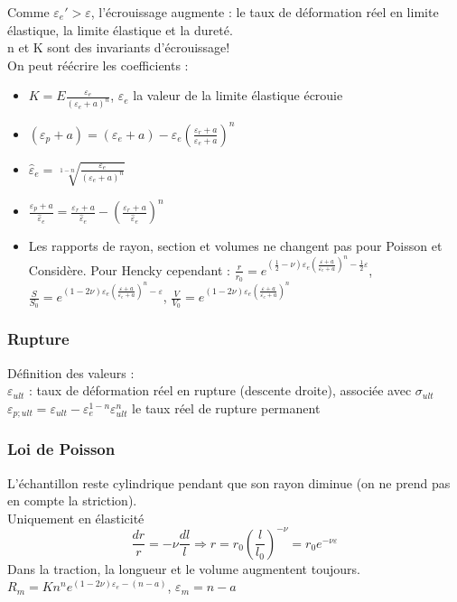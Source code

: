 \documentclass[../main.tex]{subfiles}
\begin{document}
Comme $\varepsilon_e' > \varepsilon$, l'écrouissage augmente : le taux de déformation réel en limite élastique, la limite élastique et la dureté.\\
\warning n et K sont des invariants d'écrouissage!\\

On peut réécrire les coefficients : \begin{itemize}
    \item $K = E \frac{\varepsilon_e}{(\varepsilon_e+a)^n}$, $\varepsilon_e$ la valeur de la limite élastique écrouie\\
    \item $(\varepsilon_p+a) = (\varepsilon_e+a) - \varepsilon_e (\frac{\varepsilon_r+a}{\varepsilon_e+a})^n$\\
    \item $\hat{\varepsilon}_e = \sqrt[1-n]{\frac{\varepsilon_e}{(\varepsilon_e+a)^n}} $\\
    \item $\frac{\varepsilon_p+a}{\hat{\varepsilon}_e} = \frac{\varepsilon_r+a}{\hat{\varepsilon}_e} - (\frac{\varepsilon_r+a}{\hat{\varepsilon}_e})^n$\\
    \item Les rapports de rayon, section et volumes ne changent pas pour Poisson et Considère. Pour Hencky cependant : $\frac{r}{r_0} = e^{(\frac{1}{2}-\nu)\varepsilon_e (\frac{\varepsilon+a}{\varepsilon_e+a})^n-\frac{1}{2}\varepsilon}$, $\frac{S}{S_0} = e^{(1-2\nu)\varepsilon_e (\frac{\varepsilon+a}{\varepsilon_e+a})^n-\varepsilon}$, $\frac{V}{V_0} = e^{(1-2\nu)\varepsilon_e (\frac{\varepsilon+a}{\varepsilon_e+a})^n}$
\end{itemize}

\subsubsection{Rupture}
Définition des valeurs :\\
$\varepsilon_{ult}$ : taux de déformation réel en rupture (descente droite), associée avec $\sigma_{ult}$\\
$\varepsilon_{p;ult} = \varepsilon_{ult}-\varepsilon_e^{1-n}\varepsilon_{ult}^n$ le taux réel de rupture permanent\\

\subsubsection{Loi de Poisson}
L'échantillon reste cylindrique pendant que son rayon diminue (on ne prend pas en compte la striction). \\
\warning Uniquement en élasticité\\
\begin{equation}
    \frac{dr}{r} = -\nu \frac{dl}{l} \Rightarrow r = r_0 (\frac{l}{l_0})^{-\nu} = r_0 e^{-\nu \varepsilon}
\end{equation}
Dans la traction, la longueur et le volume augmentent toujours. \\
$R_m = Kn^n e^{(1-2\nu)\varepsilon_e-(n-a)}$, $\varepsilon_m = n-a$
\end{document}
